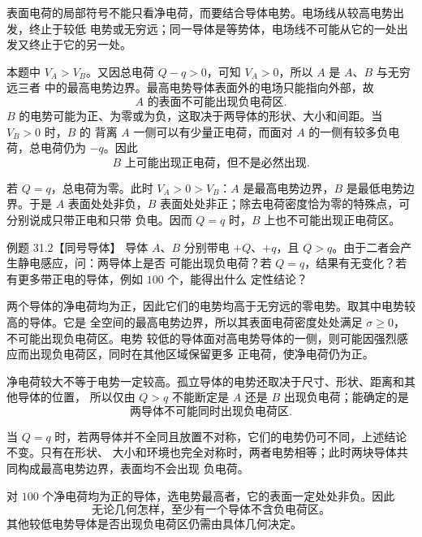 \begin{xesolution}
表面电荷的局部符号不能只看净电荷，而要结合导体电势。电场线从较高电势出发，终止于较低
电势或无穷远；同一导体是等势体，电场线不可能从它的一处出发又终止于它的另一处。

本题中 $V_A>V_B$。又因总电荷 $Q-q>0$，可知 $V_A>0$，所以 $A$ 是 $A$、$B$ 与无穷远三者
中的最高电势边界。最高电势导体表面外的电场只能指向外部，故
\[
  \boxed{A\text{ 的表面不可能出现负电荷区}}.
\]
$B$ 的电势可能为正、为零或为负，这取决于两导体的形状、大小和间距。当 $V_B>0$ 时，$B$ 的
背离 $A$ 一侧可以有少量正电荷，而面对 $A$ 的一侧有较多负电荷，总电荷仍为 $-q$。因此
\[
  \boxed{B\text{ 上可能出现正电荷，但不是必然出现}}.
\]

若 $Q=q$，总电荷为零。此时 $V_A>0>V_B$：$A$ 是最高电势边界，$B$ 是最低电势边界。于是
$A$ 表面处处非负，$B$ 表面处处非正；除去电荷密度恰为零的特殊点，可分别说成只带正电和只带
负电。因而 $Q=q$ 时，$B$ 上也不可能出现正电荷区。

\pairPotentialDiagram
\end{xesolution}

\Needspace{0.34\textheight}
\begin{origexamplebox}{例题 31.2【同号导体】}
导体 $A$、$B$ 分别带电 $+Q$、$+q$，且 $Q>q$。由于二者会产生静电感应，问：两导体上是否
可能出现负电荷？若 $Q=q$，结果有无变化？若有更多带正电的导体，例如 $100$ 个，能得出什么
定性结论？
\end{origexamplebox}

\begin{xesolution}
两个导体的净电荷均为正，因此它们的电势均高于无穷远的零电势。取其中电势较高的导体。它是
全空间的最高电势边界，所以其表面电荷密度处处满足 $\sigma\ge0$，不可能出现负电荷区。电势
较低的导体面对高电势导体的一侧，则可能因强烈感应而出现负电荷区，同时在其他区域保留更多
正电荷，使净电荷仍为正。

净电荷较大不等于电势一定较高。孤立导体的电势还取决于尺寸、形状、距离和其他导体的位置，
所以仅由 $Q>q$ 不能断定是 $A$ 还是 $B$ 出现负电荷；能确定的是
\[
  \boxed{\text{两导体不可能同时出现负电荷区}}.
\]

当 $Q=q$ 时，若两导体并不全同且放置不对称，它们的电势仍可不同，上述结论不变。只有在形状、
大小和环境也完全对称时，两者电势相等；此时两块导体共同构成最高电势边界，表面均不会出现
负电荷。

对 $100$ 个净电荷均为正的导体，选电势最高者，它的表面一定处处非负。因此
\[
  \boxed{\text{无论几何怎样，至少有一个导体不含负电荷区。}}
\]
其他较低电势导体是否出现负电荷区仍需由具体几何决定。
\end{xesolution}


